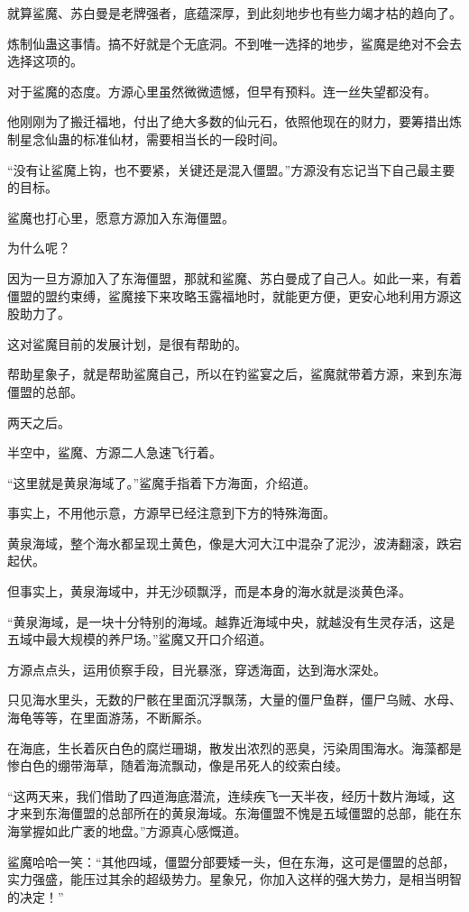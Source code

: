 \begin{this_body}
就算鲨魔、苏白曼是老牌强者，底蕴深厚，到此刻地步也有些力竭才枯的趋向了。

炼制仙蛊这事情。搞不好就是个无底洞。不到唯一选择的地步，鲨魔是绝对不会去选择这项的。

对于鲨魔的态度。方源心里虽然微微遗憾，但早有预料。连一丝失望都没有。

他刚刚为了搬迁福地，付出了绝大多数的仙元石，依照他现在的财力，要筹措出炼制星念仙蛊的标准仙材，需要相当长的一段时间。

“没有让鲨魔上钩，也不要紧，关键还是混入僵盟。”方源没有忘记当下自己最主要的目标。

鲨魔也打心里，愿意方源加入东海僵盟。

为什么呢？

因为一旦方源加入了东海僵盟，那就和鲨魔、苏白曼成了自己人。如此一来，有着僵盟的盟约束缚，鲨魔接下来攻略玉露福地时，就能更方便，更安心地利用方源这股助力了。

这对鲨魔目前的发展计划，是很有帮助的。

帮助星象子，就是帮助鲨魔自己，所以在钓鲨宴之后，鲨魔就带着方源，来到东海僵盟的总部。

两天之后。

半空中，鲨魔、方源二人急速飞行着。

“这里就是黄泉海域了。”鲨魔手指着下方海面，介绍道。

事实上，不用他示意，方源早已经注意到下方的特殊海面。

黄泉海域，整个海水都呈现土黄色，像是大河大江中混杂了泥沙，波涛翻滚，跌宕起伏。

但事实上，黄泉海域中，并无沙硕飘浮，而是本身的海水就是淡黄色泽。

“黄泉海域，是一块十分特别的海域。越靠近海域中央，就越没有生灵存活，这是五域中最大规模的养尸场。”鲨魔又开口介绍道。

方源点点头，运用侦察手段，目光暴涨，穿透海面，达到海水深处。

只见海水里头，无数的尸骸在里面沉浮飘荡，大量的僵尸鱼群，僵尸乌贼、水母、海龟等等，在里面游荡，不断厮杀。

在海底，生长着灰白色的腐烂珊瑚，散发出浓烈的恶臭，污染周围海水。海藻都是惨白色的绷带海草，随着海流飘动，像是吊死人的绞索白绫。

“这两天来，我们借助了四道海底潜流，连续疾飞一天半夜，经历十数片海域，这才来到东海僵盟的总部所在的黄泉海域。东海僵盟不愧是五域僵盟的总部，能在东海掌握如此广袤的地盘。”方源真心感慨道。

鲨魔哈哈一笑：“其他四域，僵盟分部要矮一头，但在东海，这可是僵盟的总部，实力强盛，能压过其余的超级势力。星象兄，你加入这样的强大势力，是相当明智的决定！”


\end{this_body}

